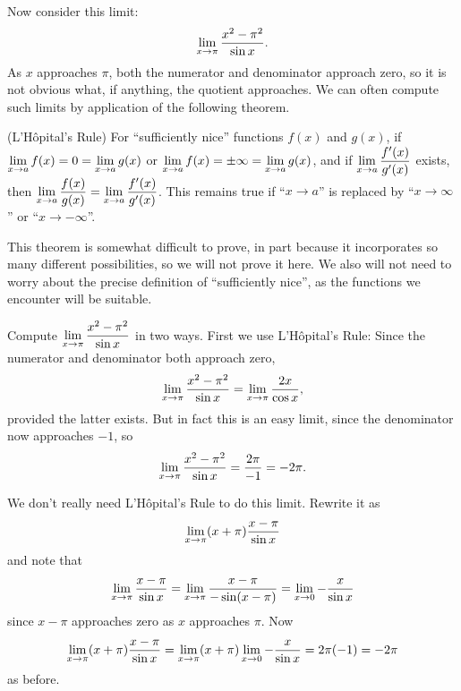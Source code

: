 Now consider this limit:
$$\lim_{x\to \pi}{x^2-\pi^2\over \sin x}.$$
As $x$ approaches $\pi$, both the numerator and denominator approach
zero, so it is not obvious what, if anything, the quotient
approaches. We can often compute such limits by application of the
following theorem.

\begin{theorem} (L'H\^opital's Rule) For ``sufficiently nice'' functions $f(x)$
and $g(x)$, if $\displaystyle\lim_{x\to a} f(x)= 0 = \lim_{x\to a}
g(x)$ or $\displaystyle\lim_{x\to a} f(x)= \pm\infty = \lim_{x\to a}
g(x)$, and if $\displaystyle\lim_{x\to a}{f'(x)\over g'(x)}$ exists,
then $\displaystyle\lim_{x\to a}{f(x)\over g(x)}=\lim_{x\to
a}{f'(x)\over g'(x)}$.  This remains true if ``$x\to a$'' is replaced
by ``$x\to \infty$'' or ``$x\to -\infty$''.
\end{theorem}

This theorem is somewhat difficult to prove, in part because it
incorporates so many different possibilities, so we will not prove it
here. We also will not need to worry about the precise definition of 
``sufficiently nice'', as the functions we encounter will be
suitable. 


\begin{example}
Compute $\displaystyle\lim_{x\to \pi}{x^2-\pi^2\over \sin x}$ in two ways.
\msk
First we use L'H\^opital's Rule: Since the numerator and denominator
both approach zero,
$$\lim_{x\to \pi}{x^2-\pi^2\over \sin x}=
\lim_{x\to \pi}{2x \over \cos x},$$
provided the latter exists. But in fact this is an easy limit, since
the denominator now approaches $-1$, so 
$$\lim_{x\to \pi}{x^2-\pi^2\over \sin x}={2\pi\over -1} = -2\pi.$$

We don't really need L'H\^opital's Rule to do this limit. Rewrite it
as 
$$\lim_{x\to \pi}(x+\pi){x-\pi\over \sin x}$$
and note that 
$$\lim_{x\to \pi}{x-\pi\over \sin x}=
\lim_{x\to \pi}{x-\pi\over -\sin (x-\pi)}=
\lim_{x\to 0}-{x\over \sin x}$$
since $x-\pi$ approaches zero as $x$ approaches $\pi$.
Now
$$\lim_{x\to \pi}(x+\pi){x-\pi\over \sin x}=
\lim_{x\to \pi}(x+\pi)\lim_{x\to 0}-{x\over \sin x}=
2\pi(-1)=-2\pi$$
as before.
\end{example}

